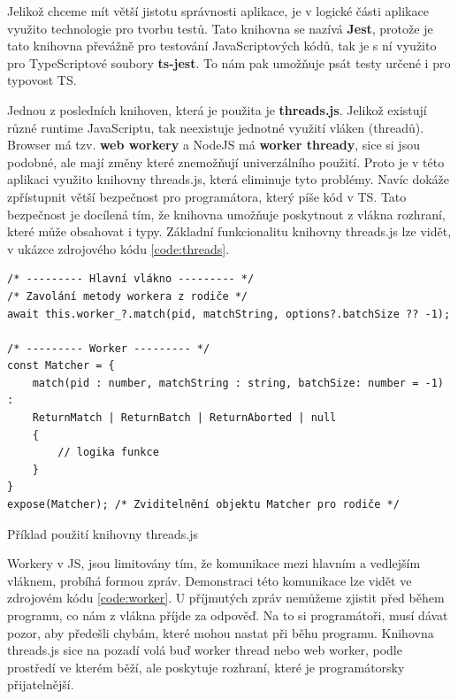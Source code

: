 Jelikož chceme mít větší jistotu správnosti aplikace, je v logické části aplikace využito technologie pro tvorbu testů. 
Tato knihovna se nazívá \textbf{Jest}, protože je tato knihovna převážně pro testování JavaScriptových kódů, 
tak je s ní využito pro TypeScriptové soubory \textbf{ts-jest}. To nám pak umožňuje psát testy určené i pro typovost TS.

Jednou z posledních knihoven, která je použita je \textbf{threads.js}. 
Jelikož existují různé runtime JavaScriptu, tak neexistuje jednotné využití vláken (threadů).
Browser má tzv. \textbf{web workery} a NodeJS má \textbf{worker thready}, sice si jsou podobné, ale mají změny které znemožňují univerzálního použití.
Proto je v této aplikaci využito knihovny threads.js, která eliminuje tyto problémy.
Navíc dokáže zpřístupnit větší bezpečnost pro programátora, který píše kód v TS. 
Tato bezpečnost je docílená tím, že knihovna umožňuje poskytnout z vlákna rozhraní, které může obsahovat i typy.
Základní funkcionalitu knihovny threads.js lze vidět, v ukázce zdrojového kódu \ref{code:threads}.

\begin{code}[!ht]
	\begin{verbatim}
/* --------- Hlavní vlákno --------- */
/* Zavolání metody workera z rodiče */
await this.worker_?.match(pid, matchString, options?.batchSize ?? -1);

/* --------- Worker --------- */
const Matcher = {
	match(pid : number, matchString : string, batchSize: number = -1) : 
	ReturnMatch | ReturnBatch | ReturnAborted | null
	{
		// logika funkce
	}
}
expose(Matcher); /* Zviditelnění objektu Matcher pro rodiče */
	\end{verbatim}
	\caption{Příklad použití knihovny threads.js}
	\label{code:threads}
\end{code}

\newpage

Workery v JS, jsou limitovány tím, že komunikace mezi hlavním a vedlejším vláknem, probíhá formou zpráv.
Demonstraci této komunikace lze vidět ve zdrojovém kódu \ref{code:worker}.
U příjmutých zpráv nemůžeme zjistit před během programu, co nám z vlákna příjde za odpověď. 
Na to si programátoři, musí dávat pozor, aby předešli chybám, které mohou nastat při běhu programu.
Knihovna threads.js sice na pozadí volá buď worker thread nebo web worker, podle prostředí ve kterém běží, 
ale poskytuje rozhraní, které je programátorsky přijatelnější.


